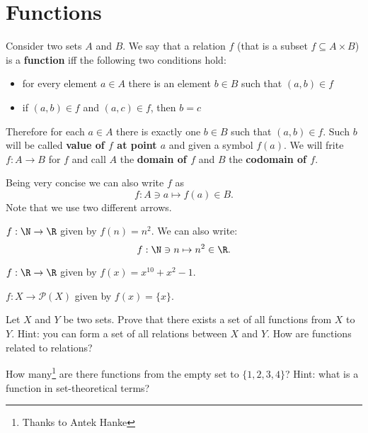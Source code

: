 \section{Functions}
\label{sec:intro_to_functions}

\begin{definition}
  Consider two sets $A$ and $B$. We say that a relation $f$ (that is a subset $f\subseteq A\times B$) is a \textbf{function}
  iff the following two conditions hold:
  \begin{itemize}
    \item for every element $a\in A$ there is an element $b\in B$ such that $(a,b)\in f$
    \item if $(a,b)\in f$ and $(a,c)\in f$, then $b=c$
  \end{itemize}
  Therefore for each $a\in A$ there is exactly one $b\in B$ such that $(a,b)\in f$. Such $b$ will be called \textbf{value of $f$ at point $a$} and given a symbol $f(a).$
  We will frite $f: A\to B$ for $f$ and call $A$ the \textbf{domain of $f$} and $B$ the \textbf{codomain of $f$}.

  Being very concise we can also write $f$ as
  $$f: A\ni a \mapsto f(a)\in B.$$
  Note that we use two different arrows.
\end{definition}

\begin{example}
  $f: \N\to \R$ given by $f(n)=n^2$. We can also write: $$f: \N\ni n\mapsto n^2\in \R.$$
\end{example}

\begin{example}
  $f: \R\to \R$ given by $f(x)=x^{10}+x^2-1$.
\end{example}

\begin{example}
  $f: X\to \mathcal P(X)$ given by $f(x)=\{x\}$.
\end{example}

\begin{exercise}
  Let $X$ and $Y$ be two sets. Prove that there exists a set of all functions from $X$ to $Y$. Hint: you can form a set of all relations between $X$ and $Y$. How are functions related
  to relations?
\end{exercise}

\begin{exercise}
	How many\footnote{Thanks to Antek Hanke} are there functions from the empty set to $\{1,2,3,4\}$? Hint: what is a function in set-theoretical terms?
\end{exercise}

